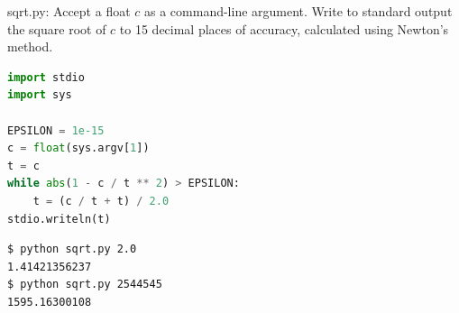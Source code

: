 \documentclass[8pt,a4paper,compress]{beamer}
\begin{document}
\begin{frame}[fragile]
\pause

\begin{framed}
\tiny sqrt.py: Accept a float $c$ as a command-line argument. Write to standard output the square root of $c$ to 15 decimal places of accuracy, calculated using Newton's method.
\end{framed}

\begin{minipage}{150pt}
\begin{lstlisting}[language=Python]
import stdio
import sys

EPSILON = 1e-15
c = float(sys.argv[1])
t = c
while abs(1 - c / t ** 2) > EPSILON:
    t = (c / t + t) / 2.0
stdio.writeln(t)
\end{lstlisting}
\end{minipage}%
\begin{minipage}{150pt}
\hfill {}
\end{minipage}

\pause

\begin{lstlisting}[language={}]
$ python sqrt.py 2.0
1.41421356237
$ python sqrt.py 2544545
1595.16300108
\end{lstlisting}
\end{frame}
\end{document}

